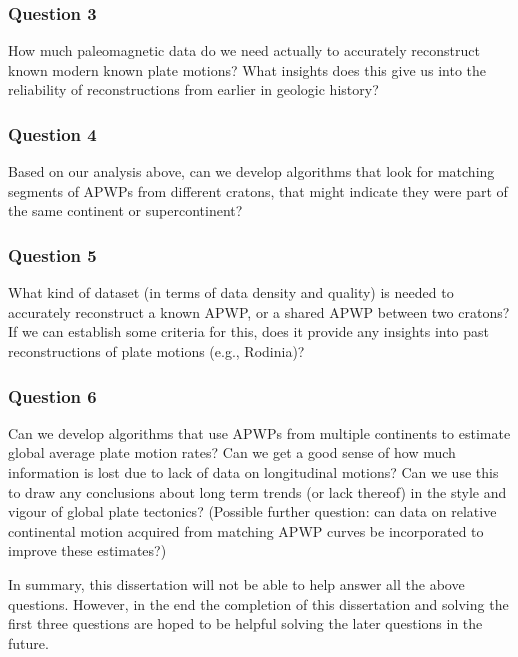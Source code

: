 \subsubsection{Question 3}

How much paleomagnetic data do we need actually to accurately reconstruct known
modern known plate motions? What insights does this give us into the reliability
of reconstructions from earlier in geologic history?

\subsubsection{Question 4}

Based on our analysis above, can we develop algorithms that look for matching
segments of APWPs from different cratons, that might indicate they were part of
the same continent or supercontinent?

\subsubsection{Question 5}

What kind of dataset (in terms of data density and quality) is needed to
accurately reconstruct a known APWP, or a shared APWP between two cratons? If
we can establish some criteria for this, does it provide any insights into past
reconstructions of plate motions (e.g., Rodinia)?

\subsubsection{Question 6}

Can we develop algorithms that use APWPs from multiple continents to estimate
global average plate motion rates? Can we get a good sense of how much
information is lost due to lack of data on longitudinal motions? Can we use
this to draw any conclusions about long term trends (or lack thereof) in the
style and vigour of global plate tectonics? (Possible further question: can
data on relative continental motion acquired from matching APWP curves be
incorporated to improve these estimates?)

In summary, this dissertation will not be able to help answer all the above
questions. However, in the end the completion of this dissertation and solving
the first three questions are hoped to be helpful solving the later questions in
the future.
